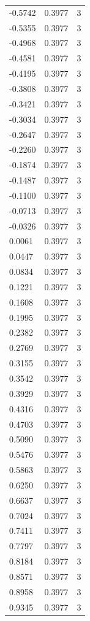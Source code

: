 \begin{longtable}{lrr}
  -0.5742 & 0.3977 & 3 \\
  -0.5355 & 0.3977 & 3 \\
  -0.4968 & 0.3977 & 3 \\
  -0.4581 & 0.3977 & 3 \\
  -0.4195 & 0.3977 & 3 \\
  -0.3808 & 0.3977 & 3 \\
  -0.3421 & 0.3977 & 3 \\
  -0.3034 & 0.3977 & 3 \\
  -0.2647 & 0.3977 & 3 \\
  -0.2260 & 0.3977 & 3 \\
  -0.1874 & 0.3977 & 3 \\
  -0.1487 & 0.3977 & 3 \\
  -0.1100 & 0.3977 & 3 \\
  -0.0713 & 0.3977 & 3 \\
  -0.0326 & 0.3977 & 3 \\
  0.0061 & 0.3977 & 3 \\
  0.0447 & 0.3977 & 3 \\
  0.0834 & 0.3977 & 3 \\
  0.1221 & 0.3977 & 3 \\
  0.1608 & 0.3977 & 3 \\
  0.1995 & 0.3977 & 3 \\
  0.2382 & 0.3977 & 3 \\
  0.2769 & 0.3977 & 3 \\
  0.3155 & 0.3977 & 3 \\
  0.3542 & 0.3977 & 3 \\
  0.3929 & 0.3977 & 3 \\
  0.4316 & 0.3977 & 3 \\
  0.4703 & 0.3977 & 3 \\
  0.5090 & 0.3977 & 3 \\
  0.5476 & 0.3977 & 3 \\
  0.5863 & 0.3977 & 3 \\
  0.6250 & 0.3977 & 3 \\
  0.6637 & 0.3977 & 3 \\
  0.7024 & 0.3977 & 3 \\
  0.7411 & 0.3977 & 3 \\
  0.7797 & 0.3977 & 3 \\
  0.8184 & 0.3977 & 3 \\
  0.8571 & 0.3977 & 3 \\
  0.8958 & 0.3977 & 3 \\
  0.9345 & 0.3977 & 3 \\

\end{longtable}
